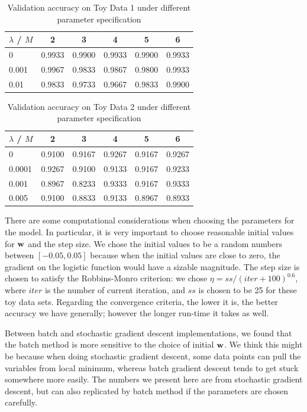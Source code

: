 \begin{table}[h!]
\centering
\caption{Validation accuracy on Toy Data 1 under different parameter specification}\label{tab:toy_1_cv}
\begin{tabular}{ lccccc }
\hline\hline
$\lambda$ / $M$ 		& 2 		& 3			&4			&5		&6\\
\hline
0 				& 0.9933    & 0.9900    & 0.9933   &  0.9900  &   0.9933\\
0.001 			& 0.9967    & 0.9833    & 0.9867    & 0.9800   &  0.9933\\
0.01				& 0.9833    & 0.9733    & 0.9667    & 0.9833   & 0.9900\\
\hline\hline
\end{tabular}
\end{table}
         
         
\begin{table}[h!]
\centering
\caption{Validation accuracy on Toy Data 2 under different parameter specification}\label{tab:toy_2_cv}
\begin{tabular}{ lccccc }
\hline\hline
$\lambda$ / $M$ 		& 2 		& 3			&4			&5		&6\\
\hline         
0        & 0.9100    & 0.9167    & 0.9267    & 0.9167    & 0.9267\\
0.0001   & 0.9267  	& 0.9100 	& 0.9133   &  0.9167   & 0.9233\\
0.001    & 0.8967    & 0.8233    & 0.9333    & 0.9167    & 0.9333\\
0.005	& 0.9100    &  0.8833    & 0.9133   & 0.8967    & 0.8933\\
\hline\hline
\end{tabular}
\end{table}


There are some computational considerations when choosing the parameters for the model. In particular, it is very important to choose reasonable initial values for $\boldsymbol{\mathbf{w}}$ and the step size. We chose the initial values to be a random numbers between $[-0.05, 0.05]$ because when the initial values are close to zero, the gradient on the logistic function would have a sizable magnitude. The step size is chosen to satisfy the Robbins-Monro criterion: we chose $\eta = ss/(iter + 100)^{0.6}$, where $iter$ is the number of current iteration, and $ss$ is chosen to be 25 for these toy data sets. Regarding the convergence criteria, the lower it is, the better accuracy we have generally; however the longer run-time it takes as well.

Between batch and stochastic gradient descent implementations, we found that the batch method is more sensitive to the choice of initial $\boldsymbol{\mathbf{w}}$. We think this might be because when doing stochastic gradient descent, some data points can pull the variables from local minimum, whereas batch gradient descent tends to get stuck somewhere more easily. The numbers we present here are from stochastic gradient descent, but can also replicated by batch method if the parameters are chosen carefully.



